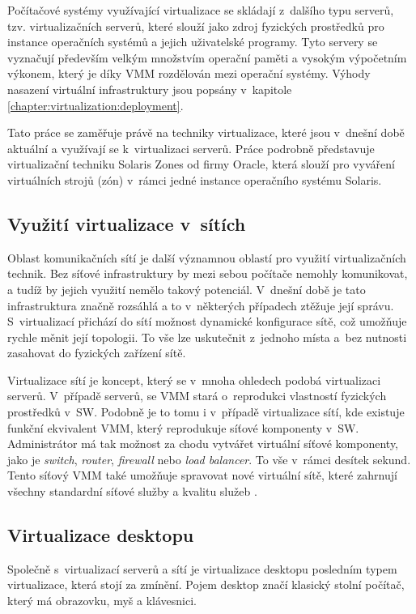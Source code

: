 Počítačové systémy využívající virtualizace se skládají z~dalšího typu serverů, tzv. virtualizačních serverů, které slouží
jako zdroj fyzických prostředků pro instance operačních systémů a jejich uživatelské programy. Tyto servery se vyznačují 
především velkým množstvím operační paměti a vysokým výpočetním výkonem, který je díky VMM rozdělován mezi operační systémy.
Výhody nasazení virtuální infrastruktury jsou popsány v~kapitole \ref{chapter:virtualization:deployment}.

Tato práce se zaměřuje právě na techniky virtualizace, které jsou v~dnešní době aktuální a využívají se k~virtualizaci serverů.
Práce podrobně představuje virtualizační techniku Solaris Zones od firmy Oracle, která slouží pro vyváření virtuálních strojů
(zón) v~rámci jedné instance operačního systému Solaris.
\subsection{Využití virtualizace v~sítích}
\label{chapter:virtualization:it:networks}
Oblast komunikačních sítí je další významnou oblastí pro využití virtualizačních technik. Bez síťové infrastruktury by
mezi sebou počítače nemohly komunikovat, a tudíž by jejich využití nemělo takový potenciál. V~dnešní době je tato infrastruktura
značně rozsáhlá a to v~některých případech ztěžuje její správu. S~virtualizací přichází do sítí možnost dynamické konfigurace
sítě, což umožňuje rychle měnit její topologii. To vše lze uskutečnit z~jednoho místa a~bez nutnosti zasahovat do fyzických
zařízení sítě.

Virtualizace sítí je koncept, který se v~mnoha ohledech podobá virtualizaci serverů. V~případě serverů, se VMM stará o~reprodukci
vlastností fyzických prostředků v~SW. Podobně je to tomu i v~případě virtualizace sítí, kde existuje funkční ekvivalent VMM, který
reprodukuje síťové komponenty v~SW. Administrátor má tak možnost za chodu vytvářet virtuální síťové komponenty, jako je 
\textit{switch}, \textit{router}, \textit{firewall} nebo \textit{load balancer}. To vše v~rámci desítek sekund. Tento síťový
VMM také umožňuje spravovat nové virtuální sítě, které zahrnují všechny standardní síťové služby a kvalitu služeb 
\cite{article:vmware:network_virtualization}.
\subsection{Virtualizace desktopu}
\label{chapter:virtualization:it:desktop}
Společně s~virtualizací serverů a sítí je virtualizace desktopu posledním typem virtualizace, která stojí za zmínění. Pojem
desktop značí klasický stolní počítač, který má obrazovku, myš a klávesnici.

